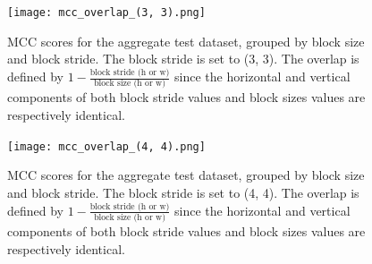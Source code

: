 \begin{figure}
    \centering
    \texttt{[image: mcc\_overlap\_(3, 3).png]}
    \caption{
        MCC scores for the aggregate test dataset, grouped by block size and block stride. The block stride is set to (3, 3). The overlap is defined by $1 - \frac{\text{block stride (h or w)}}{\text{block size (h or w)}}$ since the horizontal and vertical components of both block stride values and block sizes values are respectively identical.
    }
    \label{fig:overlap_3_3}
\end{figure}

\begin{figure}
    \centering
    \texttt{[image: mcc\_overlap\_(4, 4).png]}
    \caption{
        MCC scores for the aggregate test dataset, grouped by block size and block stride. The block stride is set to (4, 4). The overlap is defined by $1 - \frac{\text{block stride (h or w)}}{\text{block size (h or w)}}$ since the horizontal and vertical components of both block stride values and block sizes values are respectively identical.
    }
    \label{fig:overlap_4_4}
\end{figure}
